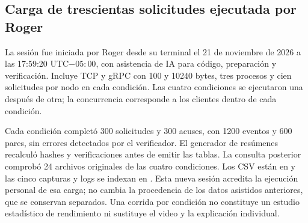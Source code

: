 \subsection{Carga de trescientas solicitudes ejecutada por Roger}
La sesión  fue iniciada por Roger desde su
terminal el 21 de noviembre de 2026 a las 17:59:20 UTC$-05:00$, con asistencia
de IA para código, preparación y verificación. Incluye TCP y gRPC con 100 y
10240 bytes, tres procesos y cien solicitudes por nodo en cada condición.
Las cuatro condiciones se ejecutaron una después de otra; la concurrencia
corresponde a los clientes dentro de cada condición.

\begin{table}[htbp]
\centering\small

\caption{Carga personal de Roger: conteos regenerados desde los CSV originales.}
\label{tab:carga-personal-roger}
\end{table}

Cada condición completó 300 solicitudes y 300 acuses, con 1200 eventos y 600
pares, sin errores detectados por el verificador. El generador de resúmenes
recalculó hashes y verificaciones antes de emitir las tablas. La consulta
posterior comprobó 24 archivos originales de las cuatro condiciones.
Los CSV están en  y
las cinco capturas y logs se indexan en .
Esta nueva sesión acredita la ejecución personal de esa carga; no cambia la
procedencia de los datos asistidos anteriores, que se conservan separados.
Una corrida por condición no constituye un estudio estadístico de rendimiento
ni sustituye el video y la explicación individual.

